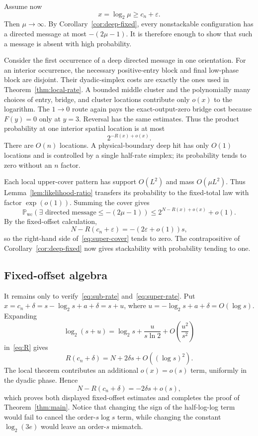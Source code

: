 \documentclass[11pt]{article}
\newcommand{\Prob}{\mathbb P}
\newcommand{\eps}{\varepsilon}
\newcommand{\wc}{\mathrm{wc}}
\begin{document}
Assume now
\[
 x=\log_2\mu\ge c_n+\eps.
\]
Then $\mu\to\infty$.  By Corollary~\ref{cor:deep-fixed}, every nonstackable
configuration has a directed message at most $-(2\mu-1)$.  It is therefore
enough to show that such a message is absent with high probability.

Consider the first occurrence of a deep directed message in one orientation.
For an interior occurrence, the necessary positive-entry block and final
low-phase block are disjoint.  Their dyadic-simplex costs are exactly the ones
used in Theorem~\ref{thm:local-rate}.  A bounded middle cluster and the
polynomially many choices of entry, bridge, and cluster locations contribute
only $o(x)$ to the logarithm.  The $1\to0$ route again pays the exact-output-zero
bridge cost because $F(y)=0$ only at $y=3$.  Reversal has the same estimates.
Thus the product probability at one interior spatial location is at most
\[
 2^{-R(x)+o(x)}.
 \tag{7.8}\label{eq:deep-location}
\]
There are $O(n)$ locations.  A physical-boundary deep hit has only $O(1)$
locations and is controlled by a single half-rate simplex; its probability
tends to zero without an $n$ factor.

Each local upper-cover pattern has support $O(L^2)$ and mass $O(\mu L^2)$.
Thus Lemma~\ref{lem:likelihood-ratio} transfers its probability to the
fixed-total law with factor $\exp(o(1))$.  Summing the cover gives
\[
 \Prob_{\wc}(\exists\text{ directed message}\le-(2\mu-1))
 \le 2^{N-R(x)+o(x)}+o(1).
 \tag{7.9}\label{eq:super-cover}
\]
By the fixed-offset calculation,
\[
 N-R(c_n+\eps)=-(2\eps+o(1))s,
 \tag{7.10}\label{eq:super-rate}
\]
so the right-hand side of~\eqref{eq:super-cover} tends to zero.  The
contrapositive of Corollary~\ref{cor:deep-fixed} now gives stackability with
probability tending to one.

\subsection{Fixed-offset algebra}\label{subsec:balance}

It remains only to verify~\eqref{eq:sub-rate} and~\eqref{eq:super-rate}.  Put
$x=c_n+\delta=s-\log_2s+a+\delta=s+u$, where
$u=-\log_2s+a+\delta=O(\log s)$.  Expanding
\[
 \log_2(s+u)=\log_2s+\frac{u}{s\ln2}
             +O\!\left(\frac{u^2}{s^2}\right)
\]
in~\eqref{eq:R} gives
\[
 R(c_n+\delta)=N+2\delta s+O((\log s)^2).
 \tag{7.11}\label{eq:fixed-offset-expansion}
\]
The local theorem contributes an additional $o(x)=o(s)$ term, uniformly in
the dyadic phase.  Hence
\[
 N-R(c_n+\delta)=-2\delta s+o(s),
 \tag{7.12}\label{eq:fixed-offset-final}
\]
which proves both displayed fixed-offset estimates and completes the proof of
Theorem~\ref{thm:main}.  Notice that changing the sign of the half-log-log term
would fail to cancel the order-$s\log s$ term, while changing the constant
$\log_2(3e)$ would leave an order-$s$ mismatch.
\end{document}
